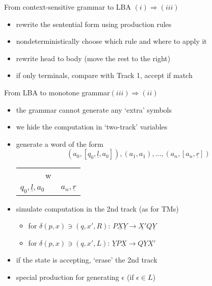 \documentclass[handout]{beamer}
\begin{document}
\begin{frame}{From context-sensitive grammar to LBA \hfill $(i)\Rightarrow(iii)$}
\begin{itemize}
        \item rewrite the sentential form using production rules
        \item \alert{nondeterministically choose} which rule and where to apply it
        \item rewrite head to body (move the rest to the right)
        \item if only terminals, compare with Track 1, accept if match\hfill\qedsymbol
    \end{itemize}

\end{frame}


\begin{frame}{From LBA to monotone grammar\hfill $(iii)\Rightarrow(ii)$}
    
    \begin{itemize}
        \item the grammar cannot generate any `extra' symbols
        \item we hide the computation in `two-track' variables
        \item generate a word of the form $$(a_0,\left[q_0,\underline{l},a_0\right]),(a_1,a_1),\ldots,(a_n,\left[a_n,\underline{r}\right]) $$

        \medskip

        \begin{center}
            \begin{tabular}{|c c c|}
            \hline
            \multicolumn{3}{|c|}{w} \\ \cline{1-3}
            \multicolumn{1}{|c|}{$q_0,\underline{l},a_0$}& \hspace{2cm} &\multicolumn{1}{|c|}{$a_n,\underline{r}$}\\\hline
            \end{tabular}
        \end{center}

        \bigskip
        
        \item simulate computation in the 2nd track (as for TMs)
        \begin{itemize}
            \item for $\delta(p,x)\ni(q,x',R)$:  $P\underline{X}\underline{Y}\rightarrow \underline{X'}Q\underline{Y}$ 
            \item for $\delta(p,x)\ni(q,x',L)$:  $\underline{Y}P\underline{X}\rightarrow Q\underline{Y}\underline{X'} $ 
        \end{itemize}
    \item if the state is accepting, `erase' the 2nd track
    \item special production for generating $\epsilon$ (if $\epsilon \in L$)\hfill\qedsymbol
    \end{itemize}

\end{frame}
\end{document}
